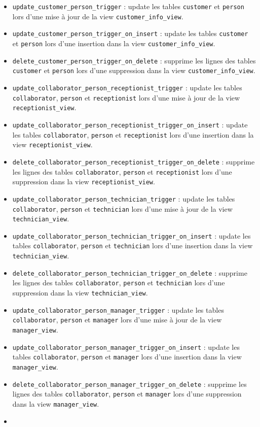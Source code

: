 \documentclass{article}
\newcommand{\ttt}{\texttt}
\begin{document}
\begin{itemize}
        \item \ttt{update\_customer\_person\_trigger} : update les tables \ttt{customer} et \ttt{person} lors d'une mise à jour de la view \ttt{customer\_info\_view}.
        \item \ttt{update\_customer\_person\_trigger\_on\_insert} : update les tables \ttt{customer} et \ttt{person} lors d'une insertion dans la view \ttt{customer\_info\_view}.
        \item \ttt{delete\_customer\_person\_trigger\_on\_delete} : supprime les lignes des tables \ttt{customer} et \ttt{person} lors d'une suppression dans la view \ttt{customer\_info\_view}.
        \item \ttt{update\_collaborator\_person\_receptionist\_trigger} : update les tables \ttt{collaborator}, \ttt{person} et \ttt{receptionist} lors d'une mise à jour de la view \ttt{receptionist\_view}.
        \item \ttt{update\_collaborator\_person\_receptionist\_trigger\_on\_insert} : update les tables \ttt{collaborator}, \ttt{person} et \ttt{receptionist} lors d'une insertion dans la view \ttt{receptionist\_view}.
        \item \ttt{delete\_collaborator\_person\_receptionist\_trigger\_on\_delete} : supprime les lignes des tables \ttt{collaborator}, \ttt{person} et \ttt{receptionist} lors d'une suppression dans la view \ttt{receptionist\_view}.
        \item \ttt{update\_collaborator\_person\_technician\_trigger} : update les tables \ttt{collaborator}, \ttt{person} et \ttt{technician} lors d'une mise à jour de la view \ttt{technician\_view}.
        \item \ttt{update\_collaborator\_person\_technician\_trigger\_on\_insert} : update les tables \ttt{collaborator}, \ttt{person} et \ttt{technician} lors d'une insertion dans la view \ttt{technician\_view}.
        \item \ttt{delete\_collaborator\_person\_technician\_trigger\_on\_delete} : supprime les lignes des tables \ttt{collaborator}, \ttt{person} et \ttt{technician} lors d'une suppression dans la view \ttt{technician\_view}.
        \item \ttt{update\_collaborator\_person\_manager\_trigger} : update les tables \ttt{collaborator}, \ttt{person} et \ttt{manager} lors d'une mise à jour de la view \ttt{manager\_view}.
        \item \ttt{update\_collaborator\_person\_manager\_trigger\_on\_insert} : update les tables \ttt{collaborator}, \ttt{person} et \ttt{manager} lors d'une insertion dans la view \ttt{manager\_view}.
        \item \ttt{delete\_collaborator\_person\_manager\_trigger\_on\_delete} : supprime les lignes des tables \ttt{collaborator}, \ttt{person} et \ttt{manager} lors d'une suppression dans la view \ttt{manager\_view}.
        \item
    \end{itemize}
\end{document}
